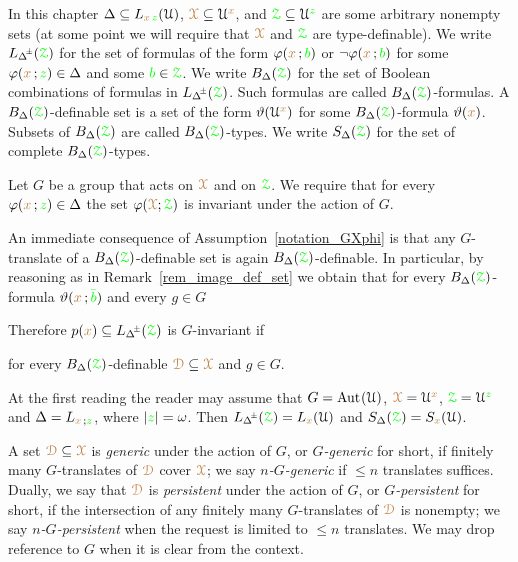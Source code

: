 In this chapter $\Delta\subseteq L_{{\color{brown} x}\,{\color{green} z}}(\EuScript U)$, ${{\color{brown}\EuScript X}}\subseteq\EuScript U^{\color{brown} x}$, and ${{\color{green}\EuScript Z}}\subseteq\EuScript U^{\color{green} z}$ are some arbitrary nonempty sets (at some point we will require that ${\color{brown}\EuScript X}$ and ${\color{green}\EuScript Z}$ are type-definable).
We write $L_{\pmDelta}({\grZ})$ for the set of formulas of the form $\varphi({\color{brown} x}\,;{\color{green} b})$ or $\neg\varphi({\color{brown} x}\,;{\color{green} b})$  for some $\varphi({\color{brown} x}\,;{\color{green} z})\in\Delta$ and some ${\color{green} b}\in{{\color{green}\EuScript Z}}$.
We write $B_\Delta({{\color{green}\EuScript Z}})$ for the set of Boolean combinations of formulas in $L_{\pmDelta}({\grZ})$.
Such formulas are called $B_\Delta({{\color{green}\EuScript Z}})$-formulas.
A $B_\Delta({{\color{green}\EuScript Z}})$-definable set is a set of the form $\vartheta(\EuScript U^{\color{brown} x})$ for some $B_\Delta({{\color{green}\EuScript Z}})$-formula $\vartheta({\color{brown} x})$.
Subsets of $B_\Delta({{\color{green}\EuScript Z}})$ are called $B_\Delta({{\color{green}\EuScript Z}})$-types.
We write $S_\Delta({{\color{green}\EuScript Z}})$ for the set of complete $B_\Delta({{\color{green}\EuScript Z}})$-types.

\begin{assumption}\label{notation_GXphi}
  Let $G$ be a group that acts on ${\color{brown}\EuScript X}$ and on ${\color{green}\EuScript Z}$.
  We require that for every $\varphi({\color{brown} x}\,;{\color{green} z})\in\Delta$ the set $\varphi({\color{brown}\EuScript X};{\color{green}\EuScript Z})$ is invariant under the action of $G$.
\end{assumption}

An immediate consequence of Assumption~\ref{notation_GXphi} is that any $G$-translate of a $B_\Delta({{\color{green}\EuScript Z}})$-definable set is again $B_\Delta({{\color{green}\EuScript Z}})$-definable.
In particular, by reasoning as in Remark~\ref{rem_image_def_set} we obtain that for every $B_\Delta({{\color{green}\EuScript Z}})$-formula $\vartheta({\color{brown} x}\,;{\color{green}\bar b})$ and every $g\in G$


Therefore $p({\mr x})\subseteq L_{\pmDelta}(\grZ)$ is $G$-invariant if

\hfill for every $B_\Delta({{\color{green}\EuScript Z}})$-definable ${\color{brown}\EuScript D}\subseteq{\color{brown}\EuScript X}$ and $g\in G$.

At the first reading the reader may assume that $G={\rm Aut\kern.15ex}(\EuScript U)$, ${\color{brown}\EuScript X}=\EuScript U^{\color{brown} x}$, ${\color{green}\EuScript Z}=\EuScript U^{\color{green} z}$ and $\Delta=L_{{\color{brown} x}\,;{\color{green} z}}$, where $|{\color{green} z}|=\omega$.
Then $L_{\pmDelta}(\grZ)=L_{\mr x}(\U)$ and  $S_\Delta({\color{green}\EuScript Z})=S_{\color{brown} x}(\EuScript U)$. 

A set ${\color{brown}\EuScript D}\subseteq{\color{brown}\EuScript X}$ is \emph{generic\/} under the action of $G$, or \emph{$G$-generic\/} for short, if finitely many $G$-translates of ${\color{brown}\EuScript D}$ cover ${\color{brown}\EuScript X}$; we say \emph{$n$-$G$-generic\/} if $\le n$ translates suffices.
Dually, we say that ${\color{brown}\EuScript D}$ is \emph{persistent\/} under the action of $G$, or \emph{$G$-persistent\/} for short, if the intersection of any finitely many $G$-translates of ${\color{brown}\EuScript D}$ is nonempty; we say \emph{$n$-$G$-persistent\/} when the request is limited to $\le n$ translates.
We may drop reference to $G$ when it is clear from the context.

